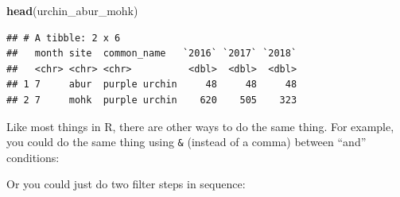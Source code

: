\documentclass[]{book}
\newenvironment{Shaded}{\begin{snugshade}}{\end{snugshade}}
\newcommand{\CommentTok}[1]{\textcolor[rgb]{0.56,0.35,0.01}{\textit{#1}}}
\newcommand{\KeywordTok}[1]{\textcolor[rgb]{0.13,0.29,0.53}{\textbf{#1}}}
\newcommand{\NormalTok}[1]{#1}
\newcommand{\OperatorTok}[1]{\textcolor[rgb]{0.81,0.36,0.00}{\textbf{#1}}}
\newcommand{\StringTok}[1]{\textcolor[rgb]{0.31,0.60,0.02}{#1}}
\begin{document}
\begin{Shaded}
\begin{Highlighting}[]
\KeywordTok{head}\NormalTok{(urchin_abur_mohk)}
\end{Highlighting}
\end{Shaded}

\begin{verbatim}
## # A tibble: 2 x 6
##   month site  common_name   `2016` `2017` `2018`
##   <chr> <chr> <chr>          <dbl>  <dbl>  <dbl>
## 1 7     abur  purple urchin     48     48     48
## 2 7     mohk  purple urchin    620    505    323
\end{verbatim}

Like most things in R, there are other ways to do the same thing. For example, you could do the same thing using \texttt{\&} (instead of a comma) between ``and'' conditions:

\begin{Shaded}
\end{Shaded}

Or you could just do two filter steps in sequence:

\begin{Shaded}
\end{Shaded}
\end{document}
